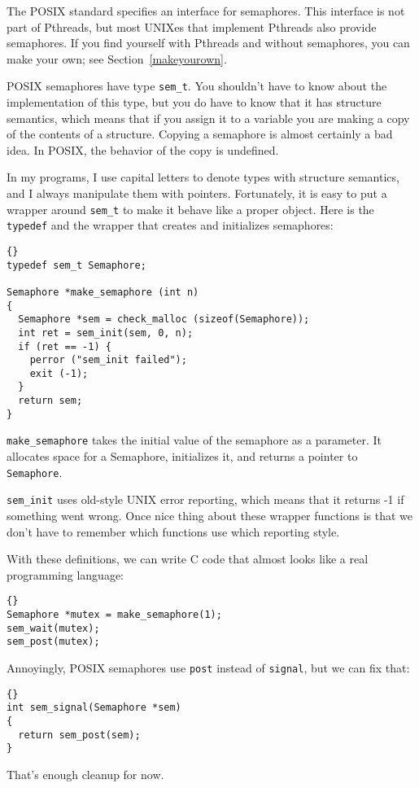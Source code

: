 The POSIX standard specifies an interface for semaphores.
This interface is not part of Pthreads, but most UNIXes
that implement Pthreads also provide semaphores.  If you
find yourself with Pthreads and without semaphores, you
can make your own; see Section~\ref{makeyourown}.

POSIX semaphores have type {\tt sem\_t}.  You shouldn't have
to know about the implementation of this type, but you do
have to know that it has structure semantics, which means that
if you assign it to a variable you are making a copy of the
contents of a structure.  Copying a semaphore is almost certainly
a bad idea.  In POSIX, the behavior of the copy is undefined.

In my programs, I use capital letters to denote types with
structure semantics, and I always manipulate them with pointers.
Fortunately, it is easy to put a wrapper around {\tt sem\_t}
to make it behave like a proper object.  Here is the 
{\tt typedef} and the wrapper that creates and initializes
semaphores:

\begin{lstlisting}[title={}]{}
typedef sem_t Semaphore;

Semaphore *make_semaphore (int n)
{
  Semaphore *sem = check_malloc (sizeof(Semaphore));
  int ret = sem_init(sem, 0, n);
  if (ret == -1) {
    perror ("sem_init failed");
    exit (-1);    
  }
  return sem;
}
\end{lstlisting}

{\tt make\_semaphore} takes the initial value of the semaphore
as a parameter.  It allocates space for a Semaphore, initializes
it, and returns a pointer to {\tt Semaphore}.

{\tt sem\_init} uses old-style UNIX error reporting, which means
that it returns -1 if something went wrong.  Once nice thing
about these wrapper functions is that we don't have to remember
which functions use which reporting style.

With these definitions, we can write C code that almost looks
like a real programming language:

\begin{lstlisting}[title={}]{}
Semaphore *mutex = make_semaphore(1);
sem_wait(mutex);
sem_post(mutex);
\end{lstlisting}

Annoyingly, POSIX semaphores use {\tt post} instead of
{\tt signal}, but we can fix that:

\begin{lstlisting}[title={}]{}
int sem_signal(Semaphore *sem)
{
  return sem_post(sem);
}
\end{lstlisting}

That's enough cleanup for now.



